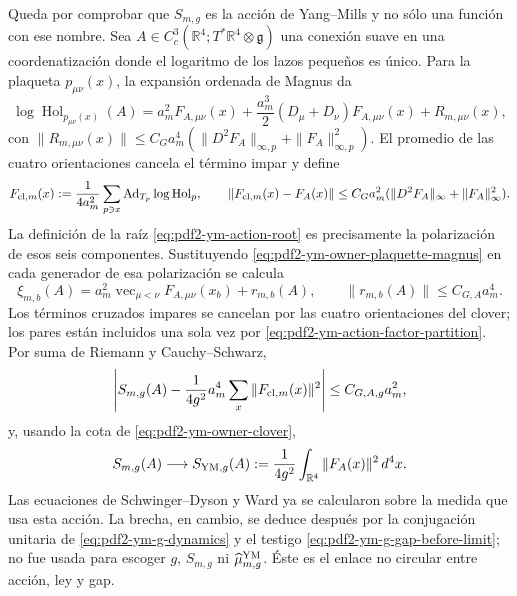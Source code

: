 Queda por comprobar que $S_{m,g}$ es la acción de Yang--Mills y no sólo una
función con ese nombre. Sea
$A\in C_c^3(\mathbb R^4;T^*\mathbb R^4\otimes\mathfrak g)$ una conexión suave en
una coordenatización donde el logaritmo de los lazos pequeños es único. Para la plaqueta
$p_{\mu\nu}(x)$, la expansión ordenada de Magnus da
\begin{equation}\label{eq:pdf2-ym-owner-plaquette-magnus}
 \log\operatorname{Hol}_{p_{\mu\nu}(x)}(A)
 =a_m^2F_{A,\mu\nu}(x)
  +\frac{a_m^3}{2}(D_\mu+D_\nu)F_{A,\mu\nu}(x)
  +R_{m,\mu\nu}(x),
\end{equation}
con
$\|R_{m,\mu\nu}(x)\|\le C_G a_m^4
(\|D^2F_A\|_{\infty,p}+\|F_A\|_{\infty,p}^2)$.
El promedio de las cuatro orientaciones cancela el término impar y define
\begin{equation}\label{eq:pdf2-ym-owner-clover}
 F_{{\rm cl},m}(x)
 :=\frac1{4a_m^2}\sum_{p\ni x}
  \operatorname{Ad}_{T_p}\log\operatorname{Hol}_p,
 \qquad
 \|F_{{\rm cl},m}(x)-F_A(x)\|
 \le C_G a_m^2(\|D^2F_A\|_\infty+\|F_A\|_\infty^2).
\end{equation}
La definición de la raíz
\eqref{eq:pdf2-ym-action-root} es precisamente la polarización de esos seis
componentes. Sustituyendo \eqref{eq:pdf2-ym-owner-plaquette-magnus} en cada
generador de esa polarización se calcula
\begin{equation}\label{eq:pdf2-ym-owner-action-root-smooth-chart}
 \xi_{m,b}(A)
 =a_m^2\operatorname{vec}_{\mu<\nu}F_{A,\mu\nu}(x_b)
  +r_{m,b}(A),
 \qquad
 \|r_{m,b}(A)\|\le C_{G,A}a_m^4.
\end{equation}
Los términos cruzados impares se cancelan por las cuatro orientaciones del clover;
los pares están incluidos una sola vez por
\eqref{eq:pdf2-ym-action-factor-partition}. Por suma de Riemann y
Cauchy--Schwarz,
\begin{equation}\label{eq:pdf2-ym-owner-action-error}
 \left|S_{m,g}(A)-\frac1{4g^2}
  a_m^4\sum_x\|F_{{\rm cl},m}(x)\|^2\right|
 \le C_{G,A,g}a_m^2,
\end{equation}
y, usando la cota de \eqref{eq:pdf2-ym-owner-clover},
\begin{equation}\label{eq:pdf2-ym-owner-f2}
 S_{m,g}(A)\longrightarrow
 S_{{\rm YM},g}(A):=\frac1{4g^2}
 \int_{\mathbb R^4}\|F_A(x)\|^2\,d^4x.
\end{equation}
Las ecuaciones de Schwinger--Dyson y Ward ya se calcularon sobre la medida que usa
esta acción. La brecha, en cambio, se deduce después por la conjugación unitaria de
\eqref{eq:pdf2-ym-g-dynamics} y el testigo
\eqref{eq:pdf2-ym-g-gap-before-limit}; no fue usada para escoger $g$, $S_{m,g}$ ni
$\widehat\mu_{m,g}^{\rm YM}$. Éste es el enlace no circular entre acción, ley y gap.

